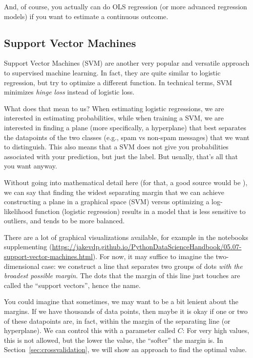 And, of course, you actually can do OLS regression (or more advanced
regression models) if you want to estimate a continuous outcome.





\subsection{Support Vector Machines}
Support Vector Machines (SVM) are another very popular and versatile
approach to supervised machine learning.  In fact, they are quite
similar to logistic regression, but try to optimize a different
function. In technical terms, SVM minimizes \emph{hinge loss} instead
of logistic loss.

What does that mean to us? When estimating logistic regressions, we
are interested in estimating probabilities, while when training a
SVM, we are interested in finding a plane (more
specifically, a hyperplane) that best separates the datapoints of the
two classes (e.g., spam vs non-spam messages) that we want to
distinguish.  This also means that a SVM does not give you
probabilities associated with your prediction, but just the label.
But usually, that's all that you want anyway.

Without going into mathematical detail here (for that, a good source
would be \citet{kelleher2015fundamentals}), we can say that finding the
widest separating margin that we can achieve constructing a plane in a
graphical space (SVM) versus optimizing a log-likelihood function
(logistic regression) results in a model that is less sensitive to
outliers, and tends to be more balanced.

There are a lot of graphical visualizations available, for example in
the notebooks supplementing \citep{vanderplas2016python}
(\url{https://jakevdp.github.io/PythonDataScienceHandbook/05.07-support-vector-machines.html}).
For now, it may suffice to imagine the two-dimensional case: we
construct a line that separates two groups of dots \emph{with the
  broadest possible margin}. The dots that the margin of this line
just touches are called the ``support vectors'', hence the name.

You could imagine that sometimes, we may want to be a bit lenient
about the margins. If we have thousands of data points, then maybe it
is okay if one or two of these datapoints are, in fact, within the
margin of the separating line (or hyperplane). We can control this with
a parameter called $C$: For very high values, this is not allowed, but
the lower the value, the ``softer'' the margin is.  In
Section~\ref{sec:crossvalidation}, we will show an approach to find
the optimal value.

